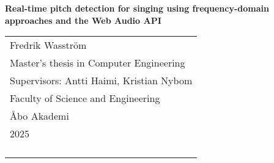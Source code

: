 
\begin{titlepage}
\vspace*{144pt}
\begin{center}
\Huge\bf Real-time pitch detection for singing using frequency-domain approaches and the Web Audio API
\end{center}
\enlargethispage{3cm}
\vfill

\hfill
\begin{tabular}[t]{l@{}}%
Fredrik Wasström\\ 
Master's thesis in Computer Engineering\\ 
Supervisors: Antti Haimi, Kristian Nybom \\
Faculty of Science and Engineering \\
Åbo Akademi\\ 
2025\\ 
\\
\\
\\
\\
\end{tabular}
\end{titlepage}

